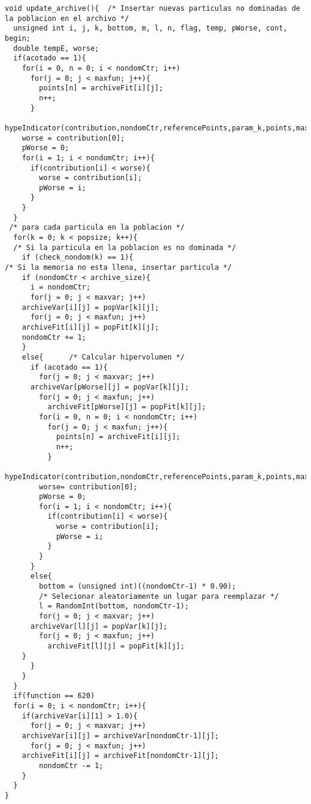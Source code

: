 \begin{lstlisting}[style=C]
void update_archive(){  /* Insertar nuevas particulas no dominadas de la poblacion en el archivo */
  unsigned int i, j, k, bottom, m, l, n, flag, temp, pWorse, cont, begin;
  double tempE, worse;
  if(acotado == 1){
    for(i = 0, n = 0; i < nondomCtr; i++)
      for(j = 0; j < maxfun; j++){
        points[n] = archiveFit[i][j];        
        n++;
      }      
    hypeIndicator(contribution,nondomCtr,referencePoints,param_k,points,maxfun);
    worse = contribution[0];
    pWorse = 0;
    for(i = 1; i < nondomCtr; i++){
      if(contribution[i] < worse){
        worse = contribution[i];
        pWorse = i;
      }
    }
  }
 /* para cada particula en la poblacion */
  for(k = 0; k < popsize; k++){
  /* Si la particula en la poblacion es no dominada */
    if (check_nondom(k) == 1){
/* Si la memoria no esta llena, insertar particula */
    if (nondomCtr < archive_size){
      i = nondomCtr;
      for(j = 0; j < maxvar; j++)
	archiveVar[i][j] = popVar[k][j];
      for(j = 0; j < maxfun; j++)
	archiveFit[i][j] = popFit[k][j];
	nondomCtr += 1;
    }
    else{      /* Calcular hipervolumen */
      if (acotado == 1){                   
        for(j = 0; j < maxvar; j++)
	  archiveVar[pWorse][j] = popVar[k][j];
        for(j = 0; j < maxfun; j++)
          archiveFit[pWorse][j] = popFit[k][j];
        for(i = 0, n = 0; i < nondomCtr; i++)
          for(j = 0; j < maxfun; j++){
            points[n] = archiveFit[i][j];
            n++;
          }
        hypeIndicator(contribution,nondomCtr,referencePoints,param_k,points,maxfun);
        worse= contribution[0];
        pWorse = 0;
        for(i = 1; i < nondomCtr; i++){
          if(contribution[i] < worse){
            worse = contribution[i];
            pWorse = i;
          }
        }          
      }
      else{
        bottom = (unsigned int)((nondomCtr-1) * 0.90);
        /* Selecionar aleatoriamente un lugar para reemplazar */
        l = RandomInt(bottom, nondomCtr-1);
        for(j = 0; j < maxvar; j++)
	  archiveVar[l][j] = popVar[k][j];
        for(j = 0; j < maxfun; j++)
          archiveFit[l][j] = popFit[k][j];
	}
      }
    }		
  }
  if(function == 620)
  for(i = 0; i < nondomCtr; i++){
    if(archiveVar[i][1] > 1.0){
      for(j = 0; j < maxvar; j++)
	archiveVar[i][j] = archiveVar[nondomCtr-1][j];
      for(j = 0; j < maxfun; j++)
	archiveFit[i][j] = archiveFit[nondomCtr-1][j];
        nondomCtr -= 1;
    }
  }
}


\end{lstlisting}

